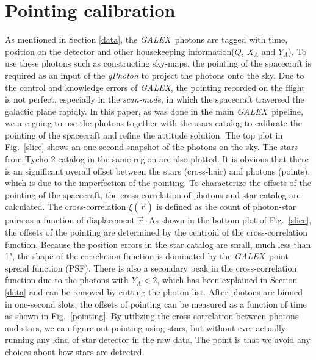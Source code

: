 \documentclass[12pt, preprint]{aastex}
\newcommand{\project}[1]{\textsl{#1}}
\newcommand{\galex}{\project{GALEX}}
\newcommand{\scanmode}{\project{scan-mode}}
\begin{document}
\section{Pointing calibration}
\label{pc}
As mentioned in Section \ref{data}, the \galex\ photons are tagged with time, position on the detector and other housekeeping information($Q$, $X_A$ and $Y_A$).
To use these photons such as constructing sky-maps, the pointing of the spacecraft is required as an input of the 
\project{gPhoton} to project the photons onto the sky.
Due to the control and knowledge errors of \galex, the pointing recorded on the flight is not perfect, especially in the \scanmode, in which the spacecraft traversed the galactic plane rapidly. 
In this paper, as was done in the main \galex\ pipeline, we are going to use the photons together with the stars catalog to calibrate the pointing of the spacecraft and refine the attitude solution.
The top plot in Fig.~\ref{slice} shows an one-second snapshot of the photons on the sky.
The stars from Tycho 2 catalog \citep{tycho2} in the same region are also plotted. 
It is obvious that there is an significant overall offset between the stars (cross-hair) and photons (points),  which is due to the imperfection of the pointing.
To characterize the offsets of the pointing of the spacecraft, the cross-correlation of photons and star catalog are calculated.
The cross-correlation $\xi(\vec{r})$ is defined as the count of photon-star pairs as a function of displacement $\vec{r}$.
As shown in the bottom plot of Fig.~\ref{slice}, the offsets of the pointing are determined by the centroid of the cross-correlation function.
Because the position errors in the star catalog are small, much less than 1", the shape of the correlation function is dominated by the \galex\ point spread function (PSF).
There is also a secondary peak in the cross-correlation function due to the photons with $Y_A<2$, which has been explained in Section \ref{data} and can be removed by cutting the photon list.
After photons are binned in one-second slots, the offsets of pointing can be measured as a function of time as shown in Fig.~\ref{pointing}.
By utilizing the cross-correlation between photons and stars, we can figure out pointing using stars, but without ever actually running any kind of star detector in the raw data. 
The point is that we avoid any choices about how stars are detected.
\end{document}
